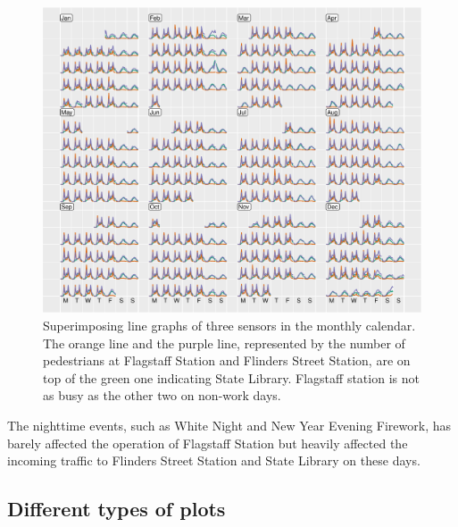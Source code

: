 \documentclass[article]{jss}
\begin{document}
\begin{CodeChunk}
\begin{figure}

{\centering \includegraphics[width=\textwidth]{figure/overlay-1} 

}

\caption[Superimposing line graphs of three sensors in the monthly calendar]{Superimposing line graphs of three sensors in the monthly calendar. The orange line and the purple line, represented by the number of pedestrians at Flagstaff Station and Flinders Street Station, are on top of the green one indicating State Library. Flagstaff station is not as busy as the other two on non-work days.}\label{fig:overlay}
\end{figure}
\end{CodeChunk}

The nighttime events, such as White Night and New Year Evening Firework,
has barely affected the operation of Flagstaff Station but heavily
affected the incoming traffic to Flinders Street Station and State
Library on these days.

\subsection{Different types of plots}\label{different-types-of-plots}
\end{document}
